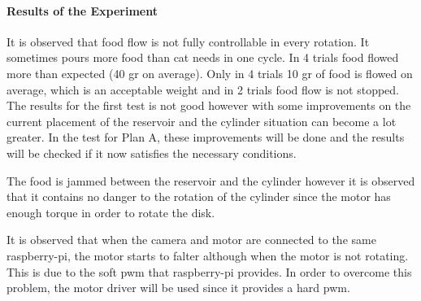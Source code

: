 \paragraph{Results of the Experiment}
It is observed that food flow is not fully controllable in every rotation. It sometimes pours more food than cat needs in one cycle. In 4 trials food flowed more than expected (40 gr on average). Only in 4 trials 10 gr of food is flowed on average, which is an acceptable weight and in 2 trials food flow is not stopped. The results for the first test is not good however with some improvements on the current placement of the reservoir and the cylinder situation can become a lot greater. In the test for Plan A, these improvements will be done and the results will be checked if it now satisfies the necessary conditions. 

The food is jammed between the reservoir and the cylinder however it is observed that it contains no danger to the rotation of the cylinder since the motor has enough torque in order to rotate the disk. 

It is observed that when the camera and motor are connected to the same raspberry-pi, the motor starts to falter although when the motor is not rotating. This is due to the soft pwm that raspberry-pi provides. In order to overcome this problem, the motor driver will be used since it provides a hard pwm.




